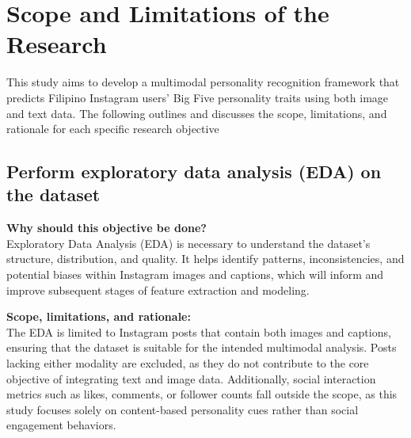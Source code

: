 


\section{Scope and Limitations of the Research}
\label{sec:scopelimitations}


	This study aims to develop a multimodal personality recognition framework that predicts Filipino Instagram users' Big Five personality traits using both image and text data. The following outlines and discusses the scope, limitations, and rationale for each specific research objective
	
	\subsection{Perform exploratory data analysis (EDA) on the dataset}
	
	\textbf{Why should this objective be done?} \\
	Exploratory Data Analysis (EDA) is necessary to understand the dataset's structure, distribution, and quality. It helps identify patterns, inconsistencies, and potential biases within Instagram images and captions, which will inform and improve subsequent stages of feature extraction and modeling.
	
	\textbf{Scope, limitations, and rationale:} \\
	The EDA is limited to Instagram posts that contain both images and captions, ensuring that the dataset is suitable for the intended multimodal analysis. Posts lacking either modality are excluded, as they do not contribute to the core objective of integrating text and image data. Additionally, social interaction metrics such as likes, comments, or follower counts fall outside the scope, as this study focuses solely on content-based personality cues rather than social engagement behaviors.
	
